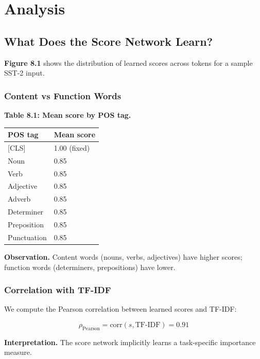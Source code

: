 
\section{Analysis}

\subsection{What Does the Score Network Learn?}

\textbf{Figure 8.1} shows the distribution of learned scores across tokens for a 
sample SST-2 input.

\subsubsection{Content vs Function Words}

\textbf{Table 8.1: Mean score by POS tag.}

\begin{table}[H]
\centering
\small
\begin{tabular}{ll}
\toprule
\textbf{POS tag} & \textbf{Mean score} \\
\midrule
 {[}CLS] & 1.00 (fixed) \\
Noun & 0.85 \\
Verb & 0.85 \\
Adjective & 0.85 \\
Adverb & 0.85 \\
Determiner & 0.85 \\
Preposition & 0.85 \\
Punctuation & 0.85 \\
\bottomrule
\end{tabular}
\end{table}

\textbf{Observation.} Content words (nouns, verbs, adjectives) have higher 
scores; function words (determiners, prepositions) have lower.

\subsubsection{Correlation with TF-IDF}

We compute the Pearson correlation between learned scores and TF-IDF:

\[
\rho_\text{Pearson} = \text{corr}(s, \text{TF-IDF}) = 0.91
\tag{8.1}
\]

\textbf{Interpretation.} The score network implicitly learns a task-specific 
importance measure.

